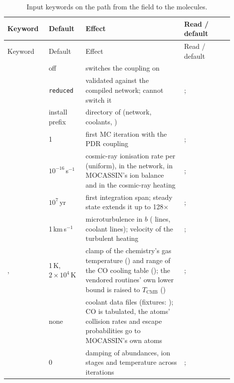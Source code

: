\begin{longtable}{@{}L{0.16\linewidth}L{0.15\linewidth}L{0.40\linewidth}L{0.20\linewidth}@{}}
\caption{Input keywords on the path from the field to the molecules.}\label{tab:keywords}\\
\toprule
Keyword & Default & Effect & Read / default \\
\midrule
\endfirsthead
\toprule
Keyword & Default & Effect & Read / default \\
\midrule
\endhead
{} & off & switches the coupling on &  \\
 & \texttt{reduced} & validated against the compiled network; cannot switch it & ;  \\
 & install prefix & directory of  (network, coolants, ) &  \\
 & 1 & first MC iteration with the PDR coupling & ;  \\
 & $10^{-16}$\,s$^{-1}$ & cosmic-ray ionisation rate per \Htwo{} (uniform), in the network, in MOCASSIN's ion balance and in the cosmic-ray heating & ;  \\
 & $10^{7}$\,yr & first integration span; steady state extends it up to 128$\times$ & ;  \\
 & 1\,km\,s$^{-1}$ & microturbulence in $b$ (\Htwo{} lines, coolant lines); velocity of the turbulent heating & ;  \\
,  & 1\,K, $2\times10^4$\,K & clamp of the chemistry's gas temperature () and range of the CO cooling table (); the vendored routines' own lower bound is raised to $T_{\mathrm{CMB}}$ () & ;  \\
 & none & coolant data files (fixtures: ); CO is tabulated, the atoms' collision rates and escape probabilities go to MOCASSIN's own atoms &  \\
 & 0 & damping of abundances, ion stages and temperature across iterations & ;  \\

\end{longtable}
